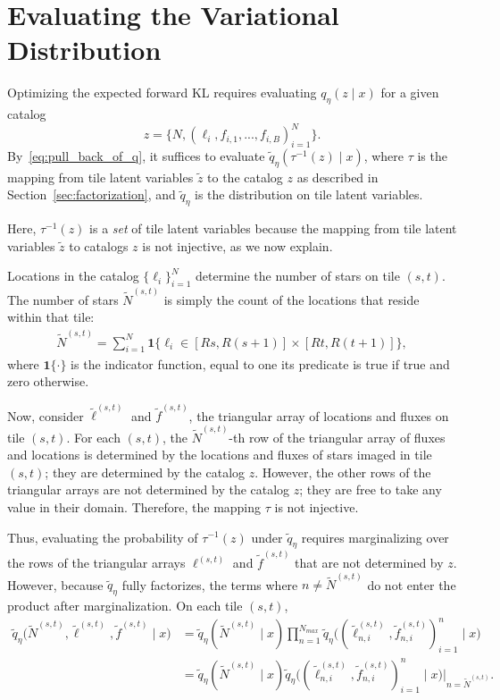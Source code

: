 \section{Evaluating the Variational Distribution}
\label{sec:eval_var_distr}

Optimizing the expected forward KL requires evaluating
$q_\eta(z \mid x)$ for a given catalog
\[z = \{N, (\ell_i, f_{i,1}, ..., f_{i,B})_{i = 1}^N\}.\]
By~\eqref{eq:pull_back_of_q}, 
it suffices to evaluate $\tilde q_\eta(\tau^{-1}(z) \mid x)$, 
where $\tau$ is the mapping from tile latent variables $\tilde z$ to the catalog $z$ as described in Section~\ref{sec:factorization}, 
and $\tilde q_\eta$ is the distribution on tile latent variables. 

Here, $\tau^{-1}(z)$ is a {\itshape set} of tile latent variables because the mapping from tile latent variables $\tilde z$ to catalogs $z$ is not injective, as we now explain.  

Locations in the catalog $\{\ell_i\}_{i=1}^N$
determine the number of stars on tile $(s,t)$. 
The number of stars $\tilde N^{(s,t)}$ is simply the count of the locations that reside within that tile:
\begin{align}
\tilde N^{(s,t)} = \sum_{i=1}^N 
\mathbf 1 \Big\{\ell_i\in [Rs, R(s+1)] \times [Rt, R(t+1)]\Big\},
\end{align}
where $\mathbf{1}\{\cdot\}$ is the indicator function, equal to one its predicate is true if true and zero otherwise.

Now, consider $\tilde\ell^{(s, t)}$ and $\tilde f^{(s, t)}$, the triangular array of locations and fluxes on tile $(s,t)$. 
For each $(s,t)$, the $\tilde N^{(s,t)}$-th row 
of the triangular array of fluxes and locations is
determined by the locations and fluxes of stars imaged in tile $(s,t)$; they are determined by the catalog $z$. However, the other rows 
of the triangular arrays are not determined by 
the catalog $z$; they are free to take any value in their domain. Therefore, the mapping $\tau$ is not injective. 

Thus, evaluating the probability of $\tau^{-1}(z)$ under $\tilde q_\eta$ requires marginalizing over the rows of the triangular arrays $\ell^{(s, t)}$ and $\tilde f^{(s, t)}$ that are not determined by $z$. However, 
because $\tilde q_\eta$ fully factorizes, the terms 
where $n \not= \tilde N^{(s,t)}$ do not enter the
product
after marginalization.
On each tile $(s,t)$,
\begin{align}
    \tilde q_\eta\big(\tilde N^{(s, t)}, \tilde \ell^{(s, t)}, \tilde f^{(s, t)} \mid x\big) &= 
    \tilde q_\eta(\tilde N^{(s,t)} \mid x) 
    \prod_{n = 1}^{N_{max}}
    \tilde q_\eta\big((\tilde \ell_{n,i}^{(s, t)}, 
    \tilde f_{n,i}^{(s, t)})_{i=1}^n \mid x\big) \\
    &= \tilde q_\eta(\tilde N^{(s,t)} \mid x) 
    \tilde q_\eta\big((\tilde \ell_{n,i}^{(s, t)}, 
    \tilde f_{n,i}^{(s, t)})_{i=1}^n \mid x\big)\Bigg|_{n = \tilde N^{(s,t)}}.
\end{align}

